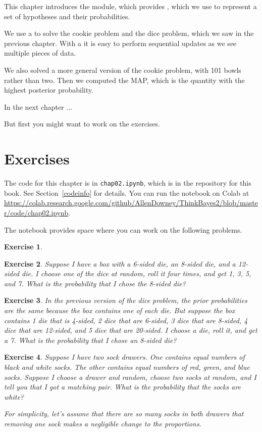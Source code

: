\documentclass[12pt]{book}
\theoremstyle{exercise}
\newtheorem{exercise}{Exercise}[chapter]
\begin{document}
This chapter introduces the  module, which provides , which we use to represent a set of hypotheses and their probabilities.

We use a  to solve the cookie problem and the dice problem, which we saw in the previous chapter.
With a  it is easy to perform sequential updates as we see multiple pieces of data.

We also solved a more general version of the cookie problem, with 101 bowls rather than two.
Then we computed the MAP, which is the quantity with the highest posterior probability.

In the next chapter ...

But first you might want to work on the exercises.


\section{Exercises}
\label{elvis}

The code for this chapter is in {\tt chap02.ipynb}, which is in the repository for this book.  See Section~\ref{codeinfo} for details.
You can run the notebook on Colab at \url{https://colab.research.google.com/github/AllenDowney/ThinkBayes2/blob/master/code/chap02.ipynb}.

The notebook provides space where you can work on the following problems.


\begin{exercise}
\end{exercise}


\begin{exercise}
Suppose I have a box with a 6-sided die, an 8-sided die, and a 12-sided die.
I choose one of the dice at random, roll it four times, and get 1, 3, 5, and 7.
What is the probability that I chose the 8-sided die?
\end{exercise}


\begin{exercise}
In the previous version of the dice problem, the prior probabilities are the same because the box contains one of each die.
But suppose the box contains 1 die that is 4-sided, 2 dice that are 6-sided, 3 dice that are 8-sided, 4 dice that are 12-sided, and 5 dice that are 20-sided.
I choose a die, roll it, and get a 7.  What is the probability that I chose an 8-sided die?
\end{exercise}


\begin{exercise}
Suppose I have two sock drawers.  
One contains equal numbers of black and white socks.  
The other contains equal numbers of red, green, and blue socks.
Suppose I choose a drawer and random, choose two socks at random, and I tell you that I got a matching pair.
What is the probability that the socks are white?

For simplicity, let's assume that there are so many socks in both drawers that removing one sock makes a negligible change to the proportions.
\end{exercise}
\end{document}
